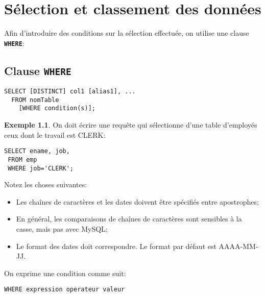 \documentclass[a4paper, 12pt]{report}
\newcommand{\textSQL}[1]{\texttt{\textbf{#1}}}
\theoremstyle{definition} \newtheorem{ex}{Exemple}
\begin{document}
\chapter{Sélection et classement des données}
Afin d'introduire des conditions sur la sélection effectuée, on utilise une clause \textSQL{WHERE}:
\section{Clause \textSQL{WHERE}}
\begin{lstlisting}[frame=single]
SELECT [DISTINCT] col1 [alias1], ...
  FROM nomTable
	[WHERE condition(s)];
\end{lstlisting}

\begin{ex}
On doit écrire une requête qui sélectionne d'une table d'employés ceux dont le travail est CLERK:
\begin{lstlisting}[frame=single]
SELECT ename, job,
 FROM emp
 WHERE job='CLERK';
\end{lstlisting}
\end{ex}

Notez les choses suivantes: \begin{itemize}%
\item Les chaînes de caractères et les dates doivent être spécifiés entre apostrophes;
\item En général, les comparaisons de chaînes de caractères sont sensibles à la casse, mais pas avec MySQL;
\item Le format des dates doit correspondre. Le format par défaut est AAAA-MM-JJ.
\end{itemize}

On exprime une condition comme suit: 
\begin{lstlisting}[frame=single]
WHERE expression operateur valeur 
\end{lstlisting}
\end{document}
